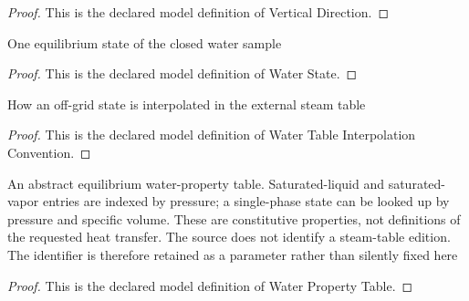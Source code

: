 \begin{proof}
  This is the declared model definition of Vertical Direction.
\end{proof}
\begin{definition}
  \label{def:physics:phyx-mini-0463:phyxminiproblems-problemphyxmini0463-waterstate}
  One equilibrium state of the closed water sample
\end{definition}
\begin{proof}
  This is the declared model definition of Water State.
\end{proof}
\begin{definition}
  \label{def:physics:phyx-mini-0463:phyxminiproblems-problemphyxmini0463-watertableinterpolationconvention}
  How an off-grid state is interpolated in the external steam table
\end{definition}
\begin{proof}
  This is the declared model definition of Water Table Interpolation Convention.
\end{proof}
\begin{definition}
  \label{def:physics:phyx-mini-0463:phyxminiproblems-problemphyxmini0463-waterpropertytable}
  An abstract equilibrium water-property table. Saturated-liquid and saturated-vapor entries are indexed by pressure; a single-phase state can be looked up by pressure and specific volume. These are constitutive properties, not definitions of the requested heat transfer. The source does not identify a steam-table edition. The identifier is therefore retained as a parameter rather than silently fixed here
\end{definition}
\begin{proof}
  This is the declared model definition of Water Property Table.
\end{proof}
